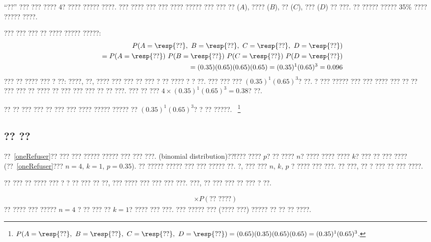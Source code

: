 \begin{example}{
``??'' ??? ??? ???? 4? ???? ????? ????. ??? ???? ??? ??? ???? ????? ??? ??? ?? ($A$), ???? ($B$), ?? ($C$), ??? ($D$) ?? ???. ?? ????? ????? 35\% ???? ????? ????.}\label{oneRefuser}

??? ??? ??? ?? ???? ????? ?????:
\begin{eqnarray*}
&&P(A=\text{\resp{??}},\text{ }B=\text{\resp{??}},\text{ }C=\text{\resp{??}},\text{ }D=\text{\resp{??}}) \\
 &&\quad =  P(A=\text{\resp{??}})\ P(B=\text{\resp{??}})\ P(C=\text{\resp{??}})\ P(D=\text{\resp{??}}) \\
 &&\quad =  (0.35)  (0.65)  (0.65)  (0.65) = (0.35)^1 (0.65)^3 = 0.096
\end{eqnarray*}
??? ?? ???? ??? ? ??: ????, ??, ???? ??? ??? ?? ??? ? ?? ???? ? ? ??. ??? ??? ??? $(0.35)^1(0.65)^3$? ??. ? ??? ????? ??? ??? ???? ??? ?? ?? ??? ??? ?? ???? ?? ??? ??? ??? ?? ?? ???. ??? ?? ??? $4\times(0.35)^1(0.65)^3 = 0.38$? ??.
\end{example}

\begin{exercise}
?? ?? ??? ??? ?? ??? ??? ???? ????? ????? ?? $(0.35)^1(0.65)^3$? ? ?? ?????.~
\footnote{$P(A=\text{\resp{??}},\text{ }B=\text{\resp{??}},\text{ }C=\text{\resp{??}},\text{ }D=\text{\resp{??}}) = (0.65)(0.35)(0.65)(0.65) = (0.35)^1(0.65)^3$.}
\end{exercise}

\textC{\newpage}


\subsection{?? ??}

??~\ref{oneRefuser}?? ??? ??? ????? ????? ??? ??? ???. (binomial distribution){??!??}? ???? $p$? ?? ???? $n$? ???? ???? ???? $k$? ??? ?? ??? ???? (??~\ref{oneRefuser}??? $n=4$, $k=1$, $p=0.35$). ?? ????? ????? ??? ??? ????? ??. ?, ??? ??? $n$, $k$, $p$ ? ???? ??? ???. ?? ???, ?? ? ??? ?? ??? ????.

?? ??? ?? ???? ??? ? ? ?? ??? ?? ??, ??? ???? ??? ??? ??? ???. ???, ?? ??? ??? ?? ??? ? ??.

\begin{eqnarray}
[\text{???? ?? (\#)}] \times P(\text{?? ????})
\label{genBinomialFormula}
\end{eqnarray}
?? ???? ??? ????? $n=4$ ? ?? ??? ?? $k=1$? ???? ??? ???. ??? ????? ??? (???? ???) ????? ?? ?? ?? ????.

